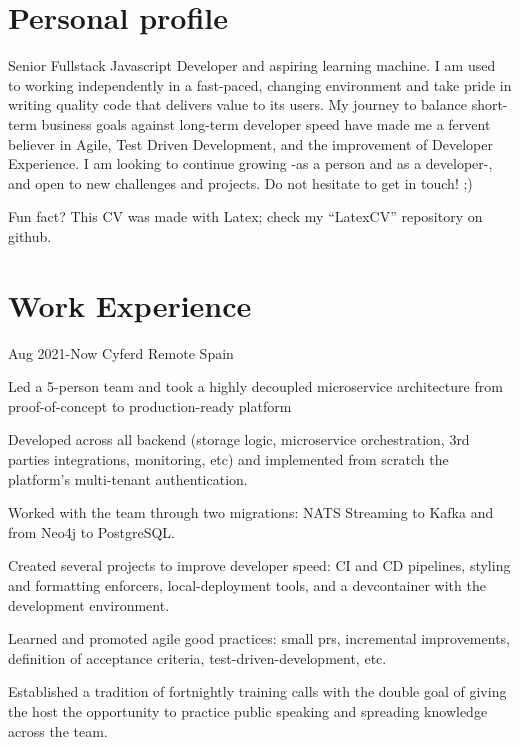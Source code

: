 \documentclass[10pt]{CurriculumVitae}
\begin{document}
  \makeheading

  \section{Personal profile}
    {
      Senior Fullstack Javascript Developer and aspiring learning machine.
      I am used to working independently in a fast-paced, changing environment and take pride in writing quality code that delivers value to its users.
      My journey to balance short-term business goals against long-term developer speed have made me a fervent believer in Agile, Test Driven Development, and the improvement of Developer Experience.
      I am looking to continue growing -as a person and as a developer-, and open to new challenges and projects.
      Do not hesitate to get in touch! ;) 
      
      \null\hfill {\scriptsize Fun fact? This CV was made with Latex; check my ``LatexCV'' repository on github.}
    }


  \section{Work Experience}

      {Aug 2021-Now}
      {Cyferd}
      {Remote}
      {Spain}
      {
        \item Led a 5-person team and took a highly decoupled microservice architecture from proof-of-concept to production-ready platform
        \item Developed across all backend (storage logic, microservice orchestration, 3rd parties integrations, monitoring, etc) and implemented from scratch the platform's multi-tenant authentication.
        \item Worked with the team through two migrations: NATS Streaming to Kafka and from Neo4j to PostgreSQL.
        \item Created several projects to improve developer speed: CI and CD pipelines, styling and formatting enforcers, local-deployment tools, and a devcontainer with the development environment.
        \item Learned and promoted agile good practices: small prs, incremental improvements, definition of acceptance criteria, test-driven-development, etc.
        \item Established a tradition of fortnightly training calls with the double goal of giving the host the opportunity to practice public speaking and spreading knowledge across the team.
      }
\end{document}
